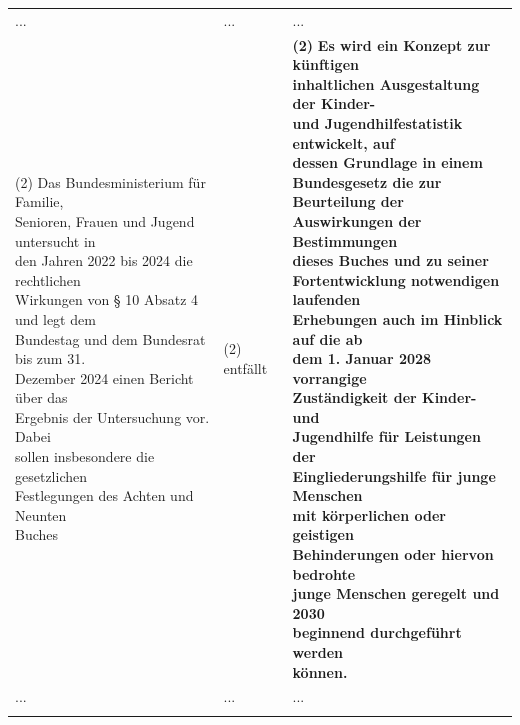 \documentclass[10pt,a4paper,landscape]{article}
\begin{document}
\begin{longtable}{|L{8.2cm}|L{8.2cm}|L{8.2cm}|}
\hhline{|---|}
... & ... & ... \\
\hhline{|---|}
(2) \textcolor{diffred}{Das Bundesministerium} für \textcolor{diffred}{Familie,  \newline Senioren, Frauen} und \textcolor{diffred}{Jugend untersucht in  \newline den Jahren 2022 bis 2024 die rechtlichen  \newline Wirkungen von \S{} 10 Absatz 4 und legt dem  \newline Bundestag und dem Bundesrat bis zum 31.  \newline Dezember 2024 einen Bericht über das  \newline Ergebnis der Untersuchung vor. Dabei  \newline sollen insbesondere die gesetzlichen  \newline Festlegungen des Achten und Neunten  \newline Buches} & (2) \textcolor{diffred}{entfällt} & \textbf{(2) }\textbf{\textcolor{diffgreen}{Es wird ein Konzept zur künftigen  \newline inhaltlichen Ausgestaltung der Kinder-  \newline und Jugendhilfestatistik entwickelt, auf  \newline dessen Grundlage in einem  \newline Bundesgesetz die zur Beurteilung der  \newline Auswirkungen der Bestimmungen  \newline dieses Buches und zu seiner  \newline Fortentwicklung notwendigen laufenden  \newline Erhebungen auch im Hinblick auf die ab  \newline dem 1. Januar 2028 vorrangige  \newline Zuständigkeit der Kinder- und  \newline Jugendhilfe für Leistungen der  \newline Eingliederungshilfe für junge Menschen  \newline mit körperlichen oder geistigen  \newline Behinderungen oder hiervon bedrohte  \newline junge Menschen geregelt und 2030  \newline beginnend durchgeführt werden  \newline können.}} \\
\hhline{|---|}
... & ... & ... \\
\hhline{|---|}

\end{longtable}
\end{document}
